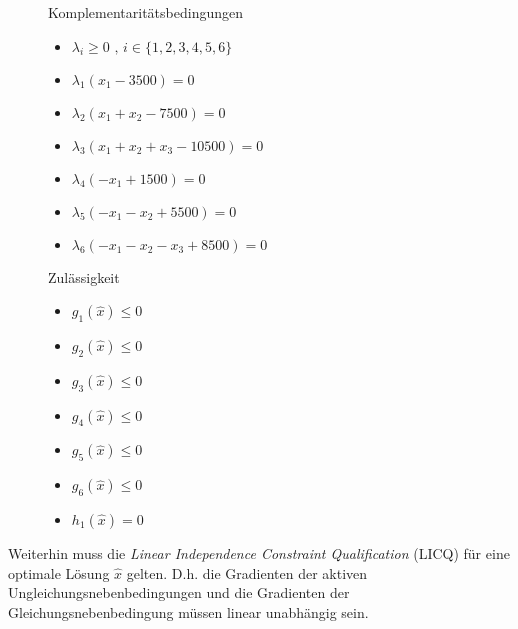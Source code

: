 \documentclass[a4paper, 12pt]{report}
\begin{document}
\begin{figure}[H]
  \centering
  \begin{minipage}[t]{0.49\textwidth}
    Komplementaritätsbedingungen
    \begin{itemize}
      \item $ \lambda_i \geq 0 \text{ , } i\in \{1, 2, 3, 4, 5, 6\}$
      \item $ \lambda_1(x_1 - 3500) = 0 $
      \item $ \lambda_2(x_1 + x_2 - 7500) = 0 $
      \item $ \lambda_3(x_1 + x_2 + x_3 - 10500) = 0 $
      \item $ \lambda_4(-x_1 + 1500) = 0 $
      \item $ \lambda_5(-x_1 -x_2 + 5500) = 0 $
      \item $ \lambda_6(-x_1 -x_2 -x_3 + 8500) = 0 $
    \end{itemize}
  \end{minipage}
  \begin{minipage}[t]{0.49\textwidth}
    Zulässigkeit
    \begin{itemize}
      \item $ g_1(\hat{x}) \leq 0 $
      \item $ g_2(\hat{x}) \leq 0 $
      \item $ g_3(\hat{x}) \leq 0 $
      \item $ g_4(\hat{x}) \leq 0 $
      \item $ g_5(\hat{x}) \leq 0 $
      \item $ g_6(\hat{x}) \leq 0 $
      \item $ h_1(\hat{x}) = 0 $
    \end{itemize}
  \end{minipage}
\end{figure}

Weiterhin muss die \textit{Linear Independence Constraint Qualification} (LICQ) für eine optimale Lösung $\hat{x}$ gelten.
D.h. die Gradienten der aktiven Ungleichungsnebenbedingungen und die Gradienten der Gleichungsnebenbedingung müssen
linear unabhängig sein.
\end{document}
